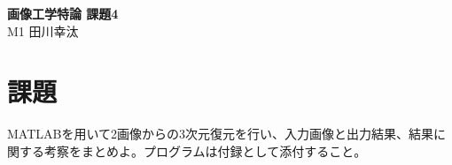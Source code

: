 \documentclass[]{jarticle}          %
\begin{document}

\vspace*{2ex}
\begin{center}
 {\Large \bf 画像工学特論 課題4}\\ %
 \vspace*{5mm}
 {\large M1 田川幸汰}%
\end{center}



\section{課題}
MATLABを用いて2画像からの3次元復元を行い、入力画像と出力結果、結果に関する考察をまとめよ。プログラムは付録として添付すること。
\end{document}
